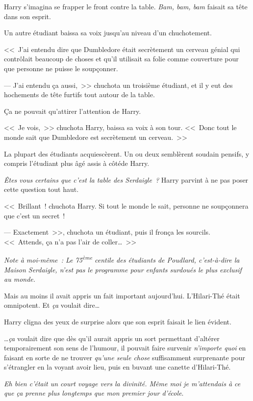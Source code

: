 Harry s'imagina se frapper le front contre la table. \emph{Bam, bam, bam} faisait sa tête dans son esprit.

Un autre étudiant baissa sa voix jusqu'au niveau d'un chuchotement.

<<~J'ai entendu dire que Dumbledore était secrètement un cerveau génial qui contrôlait beaucoup de choses et qu'il utilisait sa folie comme couverture pour que personne ne puisse le soupçonner.

--- J'ai entendu ça aussi,~>> chuchota un troisième étudiant, et il y eut des hochements de tête furtifs tout autour de la table.

Ça ne pouvait qu'attirer l'attention de Harry.

<<~Je vois,~>> chuchota Harry, baissa sa voix à son tour. <<~Donc tout le monde sait que Dumbledore est secrètement un cerveau.~>>

La plupart des étudiants acquiescèrent. Un ou deux semblèrent soudain pensifs, y compris l'étudiant plus âgé assis à côtéde Harry.

\emph{Êtes vous certains que c'est la table des Serdaigle~?} Harry parvint à ne pas poser cette question tout haut.

<<~Brillant~! chuchota Harry. Si tout le monde le sait, personne ne soupçonnera que c'est un secret~!

--- Exactement~>>, chuchota un étudiant, puis il fronça les sourcils. <<~Attends, ça n'a pas l'air de coller…~>>

\emph{Note à moi-même~: Le 75\textsuperscript{ème} centile des étudiants de Poudlard, c'est-à-dire la Maison Serdaigle, n'est pas le programme pour enfants surdoués le plus exclusif au monde.}

Mais au moins il avait appris un fait important aujourd'hui. L'Hilari-Thé était omnipotent. Et \emph{ça} voulait dire…

Harry cligna des yeux de surprise alors que son esprit faisait le lien évident.

…\emph{ça} voulait dire que dès qu'il aurait appris un sort permettant d'altérer temporairement son sens de l'humour, il pouvait faire survenir \emph{n'importe quoi} en faisant en sorte de ne trouver \emph{qu'une seule chose} suffisamment surprenante pour s'étrangler en la voyant avoir lieu, puis en buvant une canette d'Hilari-Thé.

\emph{Eh bien c'était un court voyage vers la divinité. Même moi je m'attendais à ce que ça prenne plus longtemps que mon premier jour d'école}.

